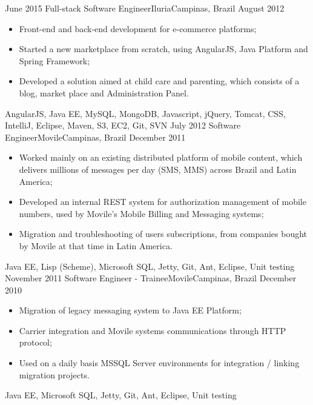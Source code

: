 \begin{experiences}
  \emptySeparator
  \experience
    {June 2015} {Full-stack Software Engineer}{Iluria}{Campinas, Brazil}
    {August 2012}    {
      \begin{itemize}
        \item Front-end and back-end development for e-commerce platforms;
        \item Started a new marketplace from scratch, using AngularJS, Java Platform and Spring Framework;
        \item Developed a solution aimed at child care and parenting, which consists of a blog, market place and Administration Panel.\\
      \end{itemize}
    }{AngularJS, Java EE, MySQL, MongoDB, Javascript, jQuery, Tomcat, CSS, IntelliJ, Eclipse, Maven, S3, EC2, Git, SVN}
  \emptySeparator
  \experience
    {July 2012} {Software Engineer}{Movile}{Campinas, Brazil}
    {December 2011}    {
          \begin{itemize}
            \item Worked mainly on an existing distributed platform of mobile content, which delivers millions of
            messages per day (SMS, MMS) across Brazil and Latin America;
            \item Developed an internal REST system for authorization management of mobile numbers,
             used by Movile's Mobile Billing and Messaging systems;
            \item Migration and troubleshooting of users subscriptions, from companies bought by Movile at that time in Latin America.\\
          \end{itemize}
        }{Java EE, Lisp (Scheme), Microsoft SQL, Jetty, Git, Ant, Eclipse, Unit testing}
  \emptySeparator
  \experience
  {November 2011} {Software Engineer - Trainee}{Movile}{Campinas, Brazil}
  {December 2010}
        {
          \begin{itemize}
            \item Migration of legacy messaging system to Java EE Platform;
            \item Carrier integration and Movile systems communications through HTTP protocol;
            \item Used on a daily basis MSSQL Server environments for integration / linking migration projects.\\
          \end{itemize}
        }{Java EE, Microsoft SQL, Jetty, Git, Ant, Eclipse, Unit testing}
\end{experiences}
